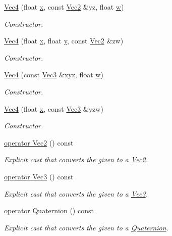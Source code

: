 \begin{DoxyCompactItemize}
\hyperlink{structgfxmath_1_1_vec4_a8211b449c2b1bbd084a7afb023525a03}{Vec4} (float \hyperlink{structgfxmath_1_1_vec4_a273598aff75406f0e7a47121b8b06037}{x}, const \hyperlink{structgfxmath_1_1_vec2}{Vec2} \&yz, float \hyperlink{structgfxmath_1_1_vec4_adf2769a47b464dfee8d04e191f21701e}{w})
\begin{DoxyCompactList}\small\item\em Constructor. \end{DoxyCompactList}\item 
\hyperlink{structgfxmath_1_1_vec4_a1565b9d0e01810e9b9cbe4fc2c82055c}{Vec4} (float \hyperlink{structgfxmath_1_1_vec4_a273598aff75406f0e7a47121b8b06037}{x}, float \hyperlink{structgfxmath_1_1_vec4_a95e0ca27d66d7e0223606c20d326b595}{y}, const \hyperlink{structgfxmath_1_1_vec2}{Vec2} \&zw)
\begin{DoxyCompactList}\small\item\em Constructor. \end{DoxyCompactList}\item 
\hyperlink{structgfxmath_1_1_vec4_a115b5e4a0a51582b23f058ad225843b1}{Vec4} (const \hyperlink{structgfxmath_1_1_vec3}{Vec3} \&xyz, float \hyperlink{structgfxmath_1_1_vec4_adf2769a47b464dfee8d04e191f21701e}{w})
\begin{DoxyCompactList}\small\item\em Constructor. \end{DoxyCompactList}\item 
\hyperlink{structgfxmath_1_1_vec4_a43924f8c2f48fc84c10bba432921d6cc}{Vec4} (float \hyperlink{structgfxmath_1_1_vec4_a273598aff75406f0e7a47121b8b06037}{x}, const \hyperlink{structgfxmath_1_1_vec3}{Vec3} \&yzw)
\begin{DoxyCompactList}\small\item\em Constructor. \end{DoxyCompactList}\item 
\hyperlink{structgfxmath_1_1_vec4_ad62fa2df15d4caf6e62b1a1374dc6ea7}{operator Vec2} () const 
\begin{DoxyCompactList}\small\item\em Explicit cast that converts the given to a \hyperlink{structgfxmath_1_1_vec2}{Vec2}. \end{DoxyCompactList}\item 
\hyperlink{structgfxmath_1_1_vec4_a451f6c531cdd3615faaf9c2fc014e4c5}{operator Vec3} () const 
\begin{DoxyCompactList}\small\item\em Explicit cast that converts the given to a \hyperlink{structgfxmath_1_1_vec3}{Vec3}. \end{DoxyCompactList}\item 
\hyperlink{structgfxmath_1_1_vec4_aaf08e3ea9dc716a152e096276d89f429}{operator Quaternion} () const 
\begin{DoxyCompactList}\small\item\em Explicit cast that converts the given to a \hyperlink{structgfxmath_1_1_quaternion}{Quaternion}. \end{DoxyCompactList}\end{DoxyCompactItemize}
